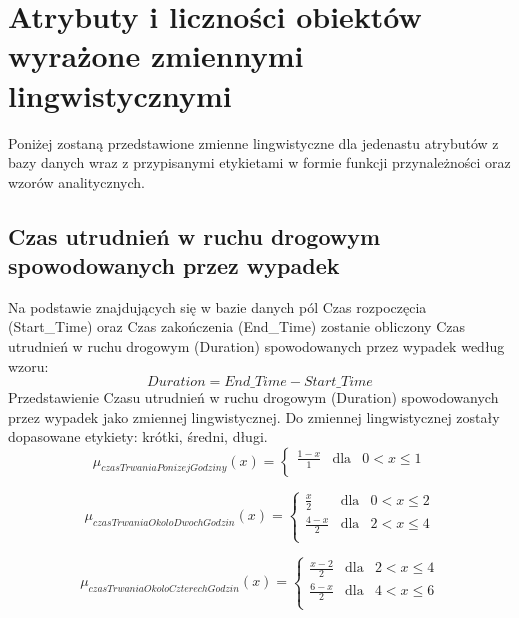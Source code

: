 \documentclass{classrep}
\begin{document}
\section{Atrybuty i liczności obiektów wyrażone zmiennymi lingwistycznymi}

Poniżej zostaną przedstawione zmienne lingwistyczne \cite{niewiadomskiRozmyte} dla jedenastu atrybutów z bazy danych wraz z przypisanymi etykietami w formie funkcji przynależności oraz wzorów analitycznych. \\

\subsection{Czas utrudnień w ruchu drogowym spowodowanych przez wypadek}
Na podstawie znajdujących się w bazie danych pól Czas rozpoczęcia (Start\_Time) oraz Czas zakończenia (End\_Time) zostanie obliczony Czas utrudnień w ruchu drogowym (Duration) spowodowanych przez wypadek według wzoru:
\begin{equation}
Duration = End\_Time - Start\_Time
\end{equation}
Przedstawienie Czasu utrudnień w ruchu drogowym (Duration) spowodowanych przez wypadek jako zmiennej lingwistycznej. Do zmiennej lingwistycznej zostały dopasowane etykiety: krótki, średni, długi.
\begin{equation}
\mu _{czasTrwaniaPonizejGodziny}(x) = \left\{ \begin{array}{rcl}
\frac{1 - x}{1} & \mbox{dla} & 0 < x \leq 1\\
\end{array}\right.
\end{equation}

\begin{equation}
\mu _{czasTrwaniaOkoloDwochGodzin}(x) = \left\{ \begin{array}{rcl}
\frac{x}{2} & \mbox{dla} & 0 < x \leq 2\\
\frac{4 - x}{2} & \mbox{dla} & 2 < x \leq 4\\
\end{array}\right.
\end{equation}

\begin{equation}
\mu _{czasTrwaniaOkoloCzterechGodzin}(x) = \left\{ \begin{array}{rcl}
\frac{x - 2}{2} & \mbox{dla} & 2 < x \leq 4\\
\frac{6 - x}{2} & \mbox{dla} & 4 < x \leq 6\\
\end{array}\right.
\end{equation}
\end{document}

